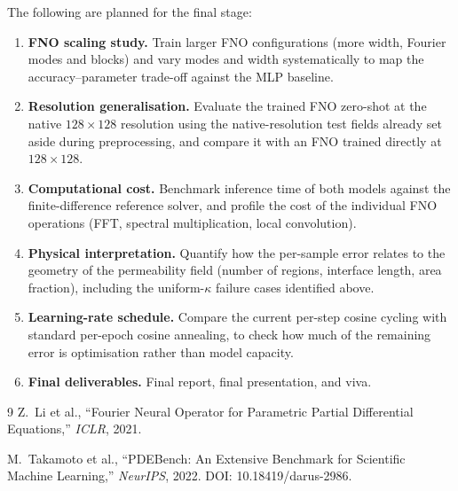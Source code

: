 \documentclass[11pt,a4paper]{article}
\begin{document}
The following are planned for the final stage:
\begin{enumerate}[nosep]
  \item \textbf{FNO scaling study.} Train larger FNO configurations (more width, Fourier modes and blocks) and vary modes and width systematically to map the accuracy--parameter trade-off against the MLP baseline.
  \item \textbf{Resolution generalisation.} Evaluate the trained FNO zero-shot at the native $128\times128$ resolution using the native-resolution test fields already set aside during preprocessing, and compare it with an FNO trained directly at $128\times128$.
  \item \textbf{Computational cost.} Benchmark inference time of both models against the finite-difference reference solver, and profile the cost of the individual FNO operations (FFT, spectral multiplication, local convolution).
  \item \textbf{Physical interpretation.} Quantify how the per-sample error relates to the geometry of the permeability field (number of regions, interface length, area fraction), including the uniform-$\kappa$ failure cases identified above.
  \item \textbf{Learning-rate schedule.} Compare the current per-step cosine cycling with standard per-epoch cosine annealing, to check how much of the remaining error is optimisation rather than model capacity.
  \item \textbf{Final deliverables.} Final report, final presentation, and viva.
\end{enumerate}

\begin{thebibliography}{9}
  Z.\ Li et al., ``Fourier Neural Operator for Parametric Partial Differential Equations,'' \textit{ICLR}, 2021.

  M.\ Takamoto et al., ``PDEBench: An Extensive Benchmark for Scientific Machine Learning,'' \textit{NeurIPS}, 2022. DOI: 10.18419/darus-2986.
\end{thebibliography}
\end{document}
